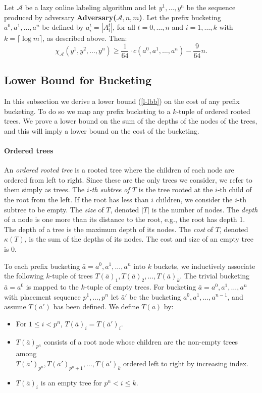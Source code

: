 \documentclass[unicode,review]{siamart1116}
\newcommand{\A}{\mathcal{A}}
\numberwithin{theorem}{section}
\begin{document}
\begin{lemma}\label{l-b2l}
Let $\A$ be a lazy online labeling algorithm and let $y^1,\ldots,y^n$ be the sequence produced by
adversary {\bf Adversary($\A,n,m$)}.  
Let the prefix bucketing $a^0,a^1,\dotsc,a^n$ be defined by $a^t_i = |A^t_i|$, for all $t=0,\dotsc,n$ and $i=1,\dotsc,k$
with $k=\lceil \log m \rceil$, as described above.
Then:
$$\chi_\A(y^1,y^2,\dotsc,y^n) \ge \frac{1}{64} \cdot c(a^0,a^1,\dotsc,a^n) - \frac{9}{64} n.$$
\end{lemma}


\subsection{Lower Bound for Bucketing}\label{s-lbb}

In this subsection we derive a lower bound (\cref{l-lbb}) on the cost of any prefix bucketing.
To do so we map any prefix bucketing to a $k$-tuple of ordered rooted trees.
We prove a lower bound on the sum of the depths of the nodes of the trees,
and this will imply a lower bound on the cost of the bucketing.

\paragraph{Ordered trees}
An {\em ordered rooted tree} is a rooted tree where the children of each node are ordered from left to right.
Since these are the only trees we consider, we refer to them simply as trees.
The \emph{$i$-th subtree of $T$} is the tree rooted at the $i$-th child of the root from the left.
If the root has less than $i$ children, we consider the $i$-th subtree to be empty.
The {\em size} of $T$, denoted $|T|$ is the number of nodes.
The {\em depth} of a node is  one more than its distance to the root, e.g., the root has depth 1.
The depth of a tree is the maximum depth of its nodes.
The \emph{cost} of $T$, denoted $\kappa(T)$, is the sum of the depths of its nodes.
The cost and size of an empty tree is 0.


To each prefix bucketing $\bar{a} = a^0,a^1,\dotsc,a^n$ into $k$ buckets, we inductively associate
the following $k$-tuple of trees $T(\bar{a})_1, T(\bar{a})_2, \dotsc, T(\bar{a})_k$.
The trivial bucketing $\bar{a} = a^0$ is mapped to the $k$-tuple of empty trees.
For bucketing $\bar{a} = a^0,a^1,\dotsc,a^n$ with placement sequence $p^1,\ldots,p^n$
let $\bar{a}'$ be the bucketing $a^0,a^1,\dotsc,a^{n-1}$, and assume $T(\bar{a}')$ has been defined.
We define $T(\bar{a})$ by:
\begin{itemize}
\item For $1 \le i < p^n$,  $T(\bar{a})_i = T(\bar{a}')_i$.
\item $T(\bar{a})_{p^n}$ consists of
a root node whose children are the non-empty trees among \\
$T(\bar{a}')_{p^n},T(\bar{a}')_{p^n+1},\dotsc,T(\bar{a}')_k$ 
ordered left to right by  increasing index.
\item $T(\bar{a})_i$ is an empty tree for $p^n < i \le k$.
\end{itemize}
\end{document}
